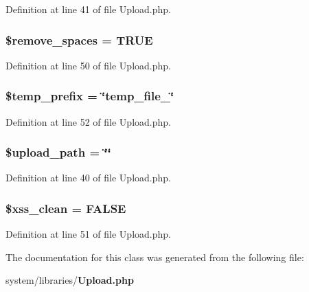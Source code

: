 Definition at line 41 of file Upload.\-php.

\subsubsection[{\$remove\-\_\-spaces}]{\setlength{\rightskip}{0pt plus 5cm}\$remove\-\_\-spaces = T\-R\-U\-E}\label{class_c_i___upload_ad9f32a52b4b2c16e42a007e0fa832721}


Definition at line 50 of file Upload.\-php.

\subsubsection[{\$temp\-\_\-prefix}]{\setlength{\rightskip}{0pt plus 5cm}\$temp\-\_\-prefix = \char`\"{}temp\-\_\-file\-\_\-\char`\"{}}\label{class_c_i___upload_ab38888cba65ae75bbc5b3841bc69d64a}


Definition at line 52 of file Upload.\-php.

\subsubsection[{\$upload\-\_\-path}]{\setlength{\rightskip}{0pt plus 5cm}\$upload\-\_\-path = \char`\"{}\char`\"{}}\label{class_c_i___upload_a38507bf82f955d4b13642a3c7fd6e773}


Definition at line 40 of file Upload.\-php.

\subsubsection[{\$xss\-\_\-clean}]{\setlength{\rightskip}{0pt plus 5cm}\$xss\-\_\-clean = F\-A\-L\-S\-E}\label{class_c_i___upload_a0f2ee8861c0b3164a5c6e126dd98c0cc}


Definition at line 51 of file Upload.\-php.



The documentation for this class was generated from the following file\-:\begin{DoxyCompactItemize}
\item 
system/libraries/{\bf Upload.\-php}\end{DoxyCompactItemize}
